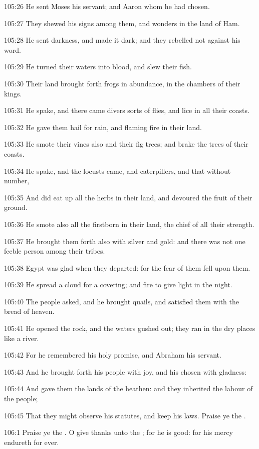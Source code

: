 105:26 He sent Moses his servant; and Aaron whom he had chosen.

105:27 They shewed his signs among them, and wonders in the land of
Ham.

105:28 He sent darkness, and made it dark; and they rebelled not
against his word.

105:29 He turned their waters into blood, and slew their fish.

105:30 Their land brought forth frogs in abundance, in the chambers of
their kings.

105:31 He spake, and there came divers sorts of flies, and lice in all
their coasts.

105:32 He gave them hail for rain, and flaming fire in their land.

105:33 He smote their vines also and their fig trees; and brake the
trees of their coasts.

105:34 He spake, and the locusts came, and caterpillers, and that
without number,

105:35 And did eat up all the herbs in their land, and devoured the
fruit of their ground.

105:36 He smote also all the firstborn in their land, the chief of all
their strength.

105:37 He brought them forth also with silver and gold: and there was
not one feeble person among their tribes.

105:38 Egypt was glad when they departed: for the fear of them fell
upon them.

105:39 He spread a cloud for a covering; and fire to give light in the
night.

105:40 The people asked, and he brought quails, and satisfied them
with the bread of heaven.

105:41 He opened the rock, and the waters gushed out; they ran in the
dry places like a river.

105:42 For he remembered his holy promise, and Abraham his servant.

105:43 And he brought forth his people with joy, and his chosen with
gladness:

105:44 And gave them the lands of the heathen: and they inherited the
labour of the people;

105:45 That they might observe his statutes, and keep his laws. Praise
ye the \LORD.



106:1 Praise ye the \LORD. O give thanks unto the \LORD; for he is good:
for his mercy endureth for ever.

